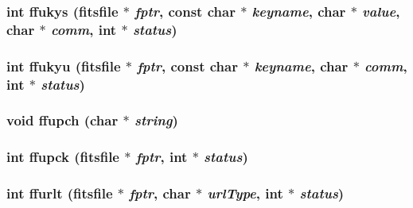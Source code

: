 \subsubsection{\setlength{\rightskip}{0pt plus 5cm}int ffukys (\bf{fitsfile} $\ast$ {\em fptr}, const char $\ast$ {\em keyname}, char $\ast$ {\em value}, char $\ast$ {\em comm}, int $\ast$ {\em status})}\label{test_2shm__client_2fitsio_8h_f2361053199299cb14085a216f6ea150}


\subsubsection{\setlength{\rightskip}{0pt plus 5cm}int ffukyu (\bf{fitsfile} $\ast$ {\em fptr}, const char $\ast$ {\em keyname}, char $\ast$ {\em comm}, int $\ast$ {\em status})}\label{test_2shm__client_2fitsio_8h_1693ffec7e5ec0faf0d81491528af4d5}


\subsubsection{\setlength{\rightskip}{0pt plus 5cm}void ffupch (char $\ast$ {\em string})}\label{test_2shm__client_2fitsio_8h_04d7a1a291fdea65a0d6033416d3185b}


\subsubsection{\setlength{\rightskip}{0pt plus 5cm}int ffupck (\bf{fitsfile} $\ast$ {\em fptr}, int $\ast$ {\em status})}\label{test_2shm__client_2fitsio_8h_755efc77a596aa5aafcab3eed4b72c77}


\subsubsection{\setlength{\rightskip}{0pt plus 5cm}int ffurlt (\bf{fitsfile} $\ast$ {\em fptr}, char $\ast$ {\em url\-Type}, int $\ast$ {\em status})}\label{test_2shm__client_2fitsio_8h_64dfbe3d89deaba3358478ef9da6cf9d}


